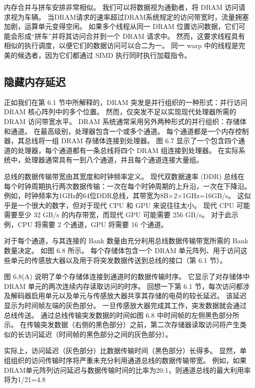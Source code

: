 内存合并与拼车安排非常相似。 我们可以将数据视为通勤者，将 DRAM 访问请求视为车辆。 当DRAM请求的速率超过DRAM系统规定的访问带宽时，流量拥塞加剧，运算单元变得空闲。 如果多个线程从同一 DRAM 位置访问数据，它们可能会形成“拼车”并将其访问合并到一个 DRAM 请求中。 然而，这要求线程具有相似的执行调度，以便它们的数据访问可以合二为一。 同一 warp 中的线程是完美的候选者，因为它们都通过 SIMD 执行同时执行加载指令。

\subsection{隐藏内存延迟}
正如我们在第 6.1 节中所解释的，DRAM 突发是并行组织的一种形式：并行访问 DRAM 核心阵列中的多个位置。 然而，仅突发不足以实现现代处理器所需的 DRAM 访问带宽水平。 DRAM 系统通常采用另外两种形式的并行组织：存储体和通道。 在最高级别，处理器包含一个或多个通道。 每个通道都是一个内存控制器，其总线将一组 DRAM 存储体连接到处理器。 图 6.7 显示了一个包含四个通道的处理器，每个通道都有一条总线将四个 DRAM 组连接到处理器。 在实际系统中，处理器通常具有一到八个通道，并且每个通道连接大量组。

总线的数据传输带宽由其宽度和时钟频率定义。 现代双数据速率 (DDR) 总线在每个时钟周期执行两次数据传输：一次在每个时钟周期的上升沿，一次在下降沿。 例如，时钟频率为1GHz的64位DDR总线，其带宽为8B×2×1GHz=16GB/s。 这似乎是一个很大的数字，但对于现代 CPU 和 GPU 来说往往太小。 现代 CPU 可能需要至少 32 GB/s 的内存带宽，而现代 GPU 可能需要 256 GB/s。 对于此示例，CPU 将需要 2 个通道，GPU 将需要 16 个通道。

对于每个通道，与其连接的 Bank 数量由充分利用总线数据传输带宽所需的 Bank 数量决定。 如图 6.8 所示。 每个存储体包含一个 DRAM 单元阵列、用于访问这些单元的传感放大器以及用于将突发数据传送到总线的接口（第 6.1 节）。

图 6.8(A) 说明了单个存储体连接到通道时的数据传输时序。 它显示了对存储体中 DRAM 单元的两次连续内存读取访问的时序。 回想一下第 6.1 节，每次访问都涉及解码器启用单元以及单元与传感放大器共享其存储的电荷的较长延迟。 该延迟显示为时间帧左端的灰色部分。 一旦传感放大器完成其工作，突发数据就会通过总线传送。 通过总线传输突发数据的时间如图 6.8 中时间帧的左侧黑色部分所示。 在传输突发数据（右侧的黑色部分）之前，第二次存储器读取访问将产生类似的长访问延迟（时间帧的黑色部分之间的灰色部分）。

实际上，访问延迟（灰色部分）比数据传输时间（黑色部分）长得多。 显然，单组组织的访问传输时序将严重未充分利用通道总线的数据传输带宽。 例如，如果DRAM单元阵列访问延迟与数据传输时间的比率为20:1，则通道总线的最大利用率将为1/21=4.8%

